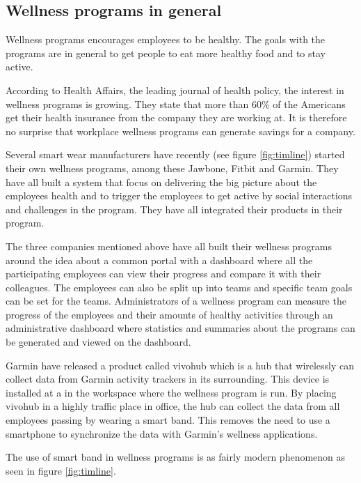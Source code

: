 \documentclass{cslthse-msc}
\begin{document}
\subsection{Wellness programs in general}
\label{sec:wellness-programs}

Wellness programs encourages employees to be healthy. The goals with the programs are in general to get people to eat more healthy food and to stay active.

According to Health Affairs, the leading journal of health policy, the interest in wellness programs is growing\cite{baicker2010workplace}. They state that more than 60\% of the Americans get their health insurance from the company they are working at. It is therefore no surprise that workplace wellness programs can generate savings for a company. 

Several smart wear manufacturers have recently (see figure \ref{fig:timline}) started their own wellness programs, among these Jawbone\cite{JawboneWellness}, Fitbit\cite{FitbitWellness} and Garmin\cite{GarminWellness}. They have all built a system that focus on delivering the big picture about the employees health and to trigger the employees to get active by social interactions and challenges in the program. They have all integrated their products in their program. 

The three companies mentioned above have all built their wellness programs around the idea about a common portal with a dashboard where all the participating employees can view their progress and compare it with their colleagues. The employees can also be split up into teams and specific team goals can be set for the teams. Administrators of a wellness program can measure the progress of the employees and their amounts of healthy activities through an administrative dashboard where statistics and summaries about the programs can be generated and viewed on the dashboard. 

Garmin have released a product called vivohub which is a hub that wirelessly can collect data from Garmin activity trackers in its surrounding. This device is installed at a in the workspace where the wellness program is run. By placing vivohub in a highly traffic place in office, the hub can collect the data from all employees passing by wearing a smart band. This removes the need to use a smartphone to synchronize the data with Garmin's wellness applications\cite{vivohub}. 

The use of smart band in wellness programs is as fairly modern phenomenon as seen in figure \ref{fig:timline}\cite{fitbitWellnessStat}\cite{jawboneWellnessStat}\cite{garminWellnessStat}.
\end{document}
